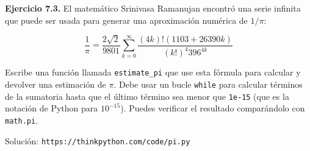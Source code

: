 \vspace{1cm}

\textbf{Ejercicio 7.3.} El matemático Srinivasa Ramanujan encontró una serie infinita que puede ser usada para generar una aproximación numérica de $1/\pi$:

\begin{equation}
\frac{1}{\pi} = \frac{2\sqrt{2}}{9801} \sum_{k=0}^{\infty} \frac{(4k)!(1103+26390k)}{(k!)^4 396^{4k}}
\end{equation}

Escribe una función llamada \texttt{estimate\_pi} que use esta fórmula para calcular y devolver una estimación de $\pi$. Debe usar un bucle \texttt{while} para calcular términos de la sumatoria hasta que el último término sea menor que \texttt{1e-15} (que es la notación de Python para $10^{-15}$). Puedes verificar el resultado comparándolo con \texttt{math.pi}.

Solución: \texttt{https://thinkpython.com/code/pi.py}